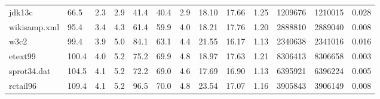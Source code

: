 \begin{table}
\begin{tabular}{@{}|l|l|l|l|l|l|l|l|l|l|l|l|l|@{}}
jdk13c       & 66.5                                                    & 2.3   & 2.9  & 41.4  & 40.4    & 2.9  & 18.10                                                           & 17.66                                                             & 1.25                                                           & 1209676 & 1210015 & 0.028                                                      \\
wikisamp.xml & 95.4                                                    & 3.4   & 4.3  & 61.4  & 59.9    & 4.0  & 18.21                                                           & 17.76                                                             & 1.20                                                           & 2888810 & 2889040 & 0.008                                                      \\
w3c2         & 99.4                                                    & 3.9   & 5.0  & 84.1  & 63.1    & 4.4  & 21.55                                                           & 16.17                                                             & 1.13                                                           & 2340638 & 2341016 & 0.016                                                      \\
etext99      & 100.4                                                   & 4.0   & 5.2  & 75.2  & 69.9    & 4.8  & 18.97                                                           & 17.63                                                             & 1.21                                                           & 8306413 & 8306658 & 0.003                                                      \\
sprot34.dat  & 104.5                                                   & 4.1   & 5.2  & 72.2  & 69.0    & 4.6  & 17.69                                                           & 16.90                                                             & 1.13                                                           & 6395921 & 6396224 & 0.005                                                      \\
rctail96     & 109.4                                                   & 4.1   & 5.2  & 96.5  & 70.0    & 4.8  & 23.54                                                           & 17.07                                                             & 1.16                                                           & 3905843 & 3906149 & 0.008                                                      \\

\end{tabular}
\end{table}
